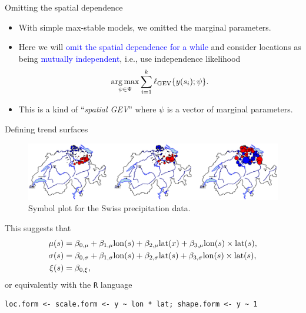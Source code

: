 \documentclass[mode=present,style=simple,paper=screen]{powerdot}
\theoremstyle{plain}%
\theoremstyle{definition}
\theoremstyle{remark}
\begin{document}
\begin{slide}[toc=Spatial GEV]{Omitting the spatial dependence}
  \begin{itemize}
  \item With simple max-stable models, we omitted the marginal parameters.
  \item Here we will \textcolor{blue}{omit the spatial dependence for
      a while} and consider locations as being
    \textcolor{blue}{mutually independent}, i.e., use independence
    likelihood
    \begin{equation*}
      \underset{\psi \in \Psi}{\arg \max} \sum_{i=1}^k \ell_{\rm
        GEV}\{y(s_i); \psi\}.
    \end{equation*}
  \item This is a kind of ``\emph{spatial GEV}'' where $\psi$ is a
    vector of marginal parameters.
  \end{itemize}
\end{slide}

\begin{slide}[toc=,method=direct]{Defining trend surfaces}
  \vspace*{-1em}
  \begin{figure}
    \centering
    \includegraphics[width=\textwidth]{Figures/symbolPlot2}
    \caption{Symbol plot for the Swiss precipitation data.}
  \end{figure}
  This suggests that
  \begin{align*}
    \mu(s) &= \beta_{0,\mu} + \beta_{1, \mu} {\rm lon}(s) + \beta_{2,
      \mu} {\rm lat}(x) + \beta_{3, \mu} {\rm lon}(s) \times {\rm lat}(s),\\
    \sigma(s) &= \beta_{0,\sigma} + \beta_{1, \sigma} {\rm lon}(s) + \beta_{2,
      \sigma} {\rm lat}(s) + \beta_{3, \sigma} {\rm lon}(s) \times {\rm lat}(s),\\
    \xi(s) &= \beta_{0,\xi},
  \end{align*}
  or equivalently with the \texttt{R} language\vspace*{-0.5em}
{\small
\begin{verbatim}
loc.form <- scale.form <- y ~ lon * lat; shape.form <- y ~ 1
\end{verbatim}
}
\end{slide}
\end{document}
